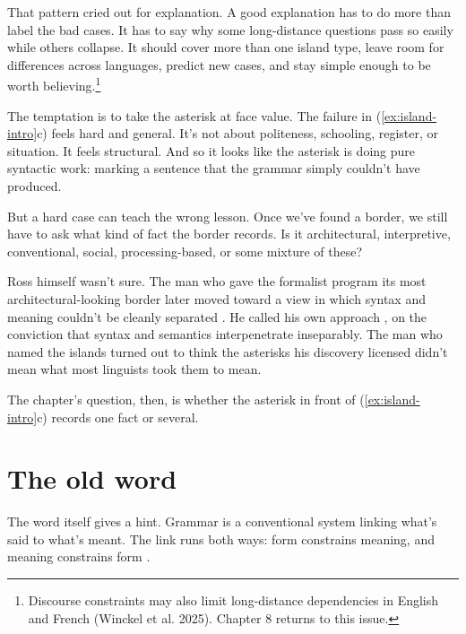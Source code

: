 That pattern cried out for explanation. A good explanation has to do more than label the bad cases. It has to say why some long-distance questions pass so easily while others collapse. It should cover more than one island type, leave room for differences across languages, predict new cases, and stay simple enough to be worth believing.\footnote{Discourse constraints may also limit long-distance dependencies in English and French (Winckel et al. 2025). Chapter 8 returns to this issue.} %

The temptation is to take the asterisk at face value. The failure in (\ref{ex:island-intro}c) feels hard and general. It's not about politeness, schooling, register, or situation. It feels structural. And so it looks like the asterisk is doing pure syntactic work: marking a sentence that the grammar simply couldn't have produced.

But a hard case can teach the wrong lesson. Once we've found a border, we still have to ask what kind of fact the border records. Is it architectural, interpretive, conventional, social, processing-based, or some mixture of these?

Ross himself wasn't sure. The man who gave the formalist program its most architectural-looking border later moved toward a view in which syntax and meaning couldn't be cleanly separated \citep{Harris2021}. He called his own approach , on the conviction that syntax and semantics interpenetrate inseparably. The man who named the islands turned out to think the asterisks his discovery licensed didn't mean what most linguists took them to mean.

The chapter's question, then, is whether the asterisk in front of (\ref{ex:island-intro}c) records one fact or several.

\section{The old word }

The word itself gives a hint. Grammar is a conventional system linking what's said to what's meant. The link runs both ways: form constrains meaning, and meaning constrains form \citep[371]{Futrell2020}. %

